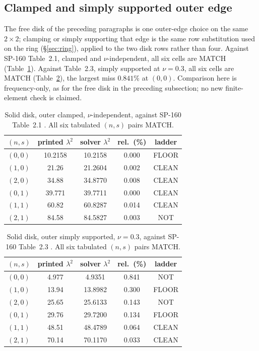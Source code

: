 \documentclass[11pt]{article}
\newcommand{\lamsq}{\lambda^{2}}
\begin{document}
\subsection{Clamped and simply supported outer edge}\label{sec:disk-cs}
The free disk of the preceding paragraphs is one outer-edge choice on the
same $2\times2$; clamping or simply supporting that edge is the same row
substitution used on the ring (\S\ref{sec:ring}), applied to the two disk
rows rather than four. Against SP-160 Table~2.1, clamped and
$\nu$-independent, all six cells are MATCH (Table~\ref{tab:disk-clamped}).
Against Table~2.3, simply supported at $\nu=0.3$, all six cells are MATCH
(Table~\ref{tab:disk-ss}), the largest miss $0.841\%$ at $(0,0)$.
Comparison here is frequency-only, as for the free disk in the preceding
subsection; no new finite-element check is claimed.

\begin{table}[htbp]\centering\small
\caption{Solid disk, outer clamped, $\nu$-independent, against SP-160
Table~2.1 \cite{leissaSP160}. All six tabulated $(n,s)$ pairs MATCH.}
\label{tab:disk-clamped}
\begin{tabular}{lcccc}
\toprule
$(n,s)$ & printed $\lamsq$ & solver $\lamsq$ & rel.\ (\%) & ladder\\
\midrule
$(0,0)$ & 10.2158 & 10.2158 & 0.000 & FLOOR \\
$(1,0)$ & 21.26 & 21.2604 & 0.002 & CLEAN \\
$(2,0)$ & 34.88 & 34.8770 & 0.008 & CLEAN \\
$(0,1)$ & 39.771 & 39.7711 & 0.000 & CLEAN \\
$(1,1)$ & 60.82 & 60.8287 & 0.014 & CLEAN \\
$(2,1)$ & 84.58 & 84.5827 & 0.003 & NOT \\
\bottomrule
\end{tabular}
\end{table}

\begin{table}[htbp]\centering\small
\caption{Solid disk, outer simply supported, $\nu=0.3$, against SP-160
Table~2.3 \cite{leissaSP160}. All six tabulated $(n,s)$ pairs MATCH.}
\label{tab:disk-ss}
\begin{tabular}{lcccc}
\toprule
$(n,s)$ & printed $\lamsq$ & solver $\lamsq$ & rel.\ (\%) & ladder\\
\midrule
$(0,0)$ & 4.977 & 4.9351 & 0.841 & NOT \\
$(1,0)$ & 13.94 & 13.8982 & 0.300 & FLOOR \\
$(2,0)$ & 25.65 & 25.6133 & 0.143 & NOT \\
$(0,1)$ & 29.76 & 29.7200 & 0.134 & FLOOR \\
$(1,1)$ & 48.51 & 48.4789 & 0.064 & CLEAN \\
$(2,1)$ & 70.14 & 70.1170 & 0.033 & CLEAN \\
\bottomrule
\end{tabular}
\end{table}
\end{document}
